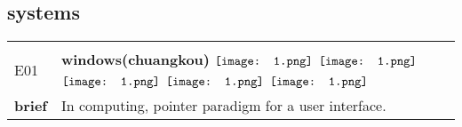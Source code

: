 \documentclass[UTF8]{article}
\begin{document}
        \subsection{\Large systems}
    \vspace{-10pt}
            \begin{tabularx}{\textwidth}{p{1.5cm}X}
            \arrayrulecolor{myBlue}
        	\hline\\
            \small{E01}&
            \large{\bfseries{windows(chuangkou)}}\hfill
                                                            \phantom{$\vcenter{\hbox{\texttt{[image: 1.png]}}}$}
                                                                \phantom{$\vcenter{\hbox{\texttt{[image: 1.png]}}}$}
                                                                $\vcenter{\hbox{\texttt{[image: 1.png]}}}$
                                                                $\vcenter{\hbox{\texttt{[image: 1.png]}}}$
                                                                $\vcenter{\hbox{\texttt{[image: 1.png]}}}$
                                                                $\vcenter{\hbox{\texttt{[image: 1.png]}}}$
                                                                $\vcenter{\hbox{\texttt{[image: 1.png]}}}$
                                        \\[10pt]
            \large{\bfseries{brief}}&\noindent\parbox[c]{\hsize}{In computing, pointer paradigm for a user interface.} \\[5pt]
            \hline\\[-10pt]
        \end{tabularx}
\end{document}
